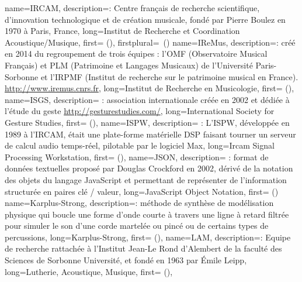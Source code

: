 {
    name={IRCAM},
    description={\textit{}: Centre français de recherche scientifique, d'innovation technologique et de création musicale, fondé par Pierre Boulez en 1970 à Paris, France},
    long={Institut de Recherche et Coordination Acoustique/Musique},
    first={} (),
    firstplural={\glspluralsuffix\ (\glspluralsuffix)}
}
{
    name={IReMus},
    description={\textit{}: créé en 2014 du regroupement de trois équipes : l'OMF (Observatoire Musical Français) et PLM (Patrimoine et Langages Musicaux) de l’Université Paris-Sorbonne et l’IRPMF (Institut de recherche sur le patrimoine musical en France). \url{http://www.iremus.cnrs.fr}},
    long={Institut de Recherche en Musicologie},
    first={} (),
}
{
    name={ISGS},
    description={\textit{} : association internationale créée en 2002 et dédiée à l'étude du geste \url{http://gesturestudies.com/}},
    long={International Society for Gesture Studies},
    first={} (),
}
{
    name={ISPW},
    description={\textit{} : L'ISPW, développée en 1989 à l'\gls{IRCAM}, était une plate-forme matérielle \gls{DSP} faisant tourner un serveur de calcul audio temps-réel, pilotable par le logiciel Max},
    long={Ircam Signal Processing Workstation},
    first={} (),
}
{
    name={JSON},
    description={\textit{} : format de données textuelles proposé par Douglas Crockford en 2002, dérivé de la notation des objets du langage JavaScript et permettant de représenter de l’information structurée en paires clé / valeur},
    long={JavaScript Object Notation},
    first={} ()
}
{
    name={Karplus-Strong},
    description={\textit{}: méthode de synthèse de modélisation physique qui boucle une forme d'onde courte à travers une ligne à retard filtrée pour simuler le son d'une corde martelée ou pincé ou de certains types de percussions},
    long={Karplus-Strong},
    first={} (),
}
{
    name={LAM},
    description={\textit{}: Equipe de recherche rattachée à l'Institut Jean-Le Rond d'Alembert de la faculté des Sciences de Sorbonne Université, et fondé en 1963 par Émile Leipp},
    long={Lutherie, Acoustique, Musique},
    first={} (),
}
